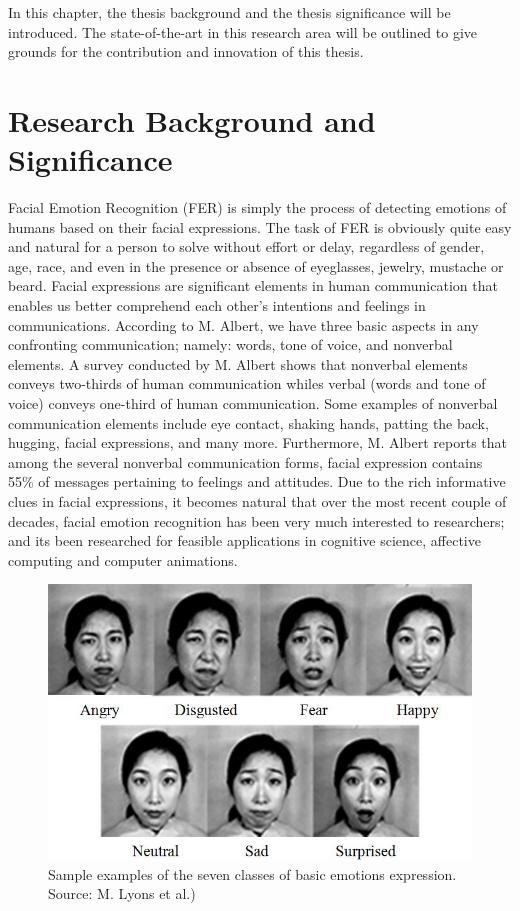 \documentclass[master]{thesis-uestc}
\begin{document}
In this chapter, the thesis background and the thesis significance will be introduced. The state-of-the-art in this research area will be outlined to give grounds for the contribution and innovation of this thesis. 

\section{Research Background and Significance}
Facial Emotion Recognition (FER) is simply the process of detecting emotions of humans based on their facial expressions. The task of FER is obviously quite easy and natural for a person to solve without effort or delay, regardless of gender, age, race, and even in the presence or absence of eyeglasses, jewelry, mustache or beard\cite{Ivanovsky-2017}. Facial expressions are significant elements in human communication that enables us better comprehend each other's intentions and feelings in communications. According to M. Albert\cite{albert1968}, we have three basic aspects in any confronting communication; namely: words, tone of voice, and nonverbal elements. A survey conducted by M. Albert\cite{albert1968} shows that nonverbal elements conveys two-thirds of human communication whiles verbal (words and tone of voice) conveys one-third of human communication. Some examples of nonverbal communication elements include eye contact, shaking hands, patting the back, hugging, facial expressions, and many more. Furthermore, M. Albert\cite{albert1968} reports that among the several nonverbal communication forms, facial expression contains 55\% of messages pertaining to feelings and attitudes. Due to the rich informative clues in facial expressions, it becomes natural that over the most recent couple of decades, facial emotion recognition has been very much interested to researchers; and its been researched for feasible applications in cognitive science, affective computing and computer animations.

\begin{figure}[ht]
\includegraphics[width=5in]{pic/7_basic_emotions.png}
\caption{Sample examples of the seven classes of basic emotions expression. Source: M. Lyons et al.\cite{Michael-2017})}
\label{7_basic_emotions}
\end{figure}
\end{document}
